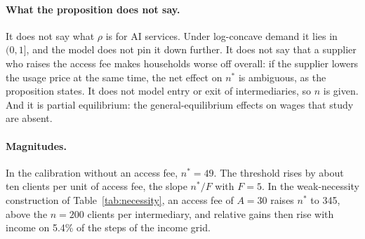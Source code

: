 \documentclass[12pt]{article}
\theoremstyle{remark}
\begin{document}
\paragraph{What the proposition does not say.} It does not say what $\rho$ is for AI services. Under log-concave demand it lies in $(0,1]$, and the model does not pin it down further. It does not say that a supplier who raises the access fee makes households worse off overall: if the supplier lowers the usage price at the same time, the net effect on $n^*$ is ambiguous, as the proposition states. It does not model entry or exit of intermediaries, so $n$ is given. And it is partial equilibrium: the general-equilibrium effects on wages that \citet{athey2026competition} study are absent.

\paragraph{Magnitudes.} In the calibration without an access fee, $n^*=49$. The threshold rises by about ten clients per unit of access fee, the slope $n^*/F$ with $F=5$. In the weak-necessity construction of Table~\ref{tab:necessity}, an access fee of $A=30$ raises $n^*$ to 345, above the $n=200$ clients per intermediary, and relative gains then rise with income on 5.4\% of the steps of the income grid.
\end{document}
